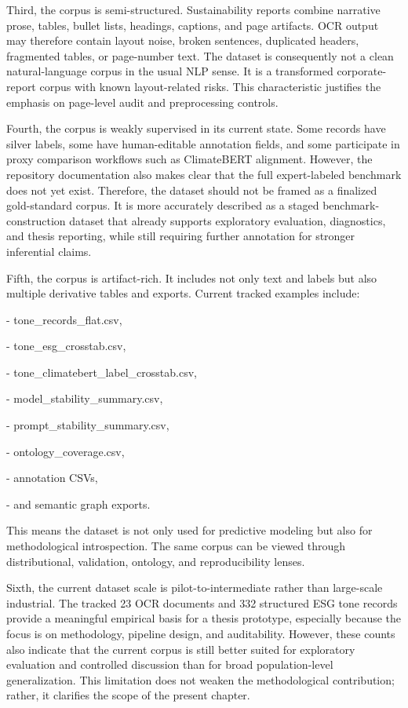 \documentclass{article}
\begin{document}
Third, the corpus is semi-structured. Sustainability reports combine narrative prose, tables, bullet lists, headings, captions, and page artifacts. OCR output may therefore contain layout noise, broken sentences, duplicated headers, fragmented tables, or page-number text. The dataset is consequently not a clean natural-language corpus in the usual NLP sense. It is a transformed corporate-report corpus with known layout-related risks. This characteristic justifies the emphasis on page-level audit and preprocessing controls.

Fourth, the corpus is weakly supervised in its current state. Some records have silver labels, some have human-editable annotation fields, and some participate in proxy comparison workflows such as ClimateBERT alignment. However, the repository documentation also makes clear that the full expert-labeled benchmark does not yet exist. Therefore, the dataset should not be framed as a finalized gold-standard corpus. It is more accurately described as a staged benchmark-construction dataset that already supports exploratory evaluation, diagnostics, and thesis reporting, while still requiring further annotation for stronger inferential claims.

Fifth, the corpus is artifact-rich. It includes not only text and labels but also multiple derivative tables and exports. Current tracked examples include:

- tone\_records\_flat.csv,

- tone\_esg\_crosstab.csv,

- tone\_climatebert\_label\_crosstab.csv,

- model\_stability\_summary.csv,

- prompt\_stability\_summary.csv,

- ontology\_coverage.csv,

- annotation CSVs,

- and semantic graph exports.

This means the dataset is not only used for predictive modeling but also for methodological introspection. The same corpus can be viewed through distributional, validation, ontology, and reproducibility lenses.

Sixth, the current dataset scale is pilot-to-intermediate rather than large-scale industrial. The tracked 23 OCR documents and 332 structured ESG tone records provide a meaningful empirical basis for a thesis prototype, especially because the focus is on methodology, pipeline design, and auditability. However, these counts also indicate that the current corpus is still better suited for exploratory evaluation and controlled discussion than for broad population-level generalization. This limitation does not weaken the methodological contribution; rather, it clarifies the scope of the present chapter.
\end{document}
